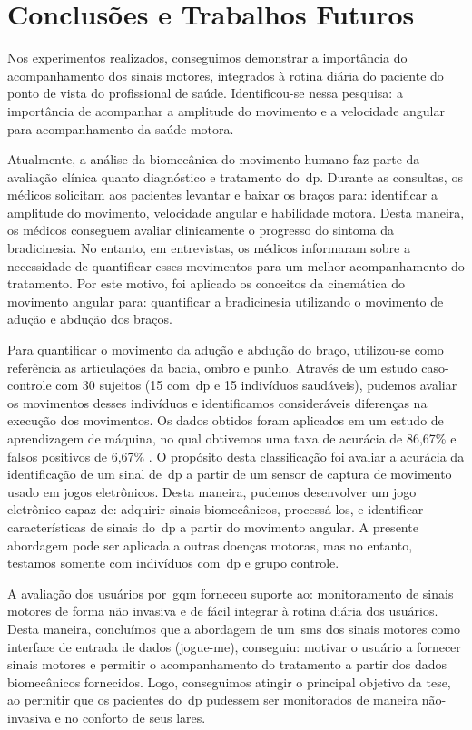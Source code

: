 \chapter{Conclusões e Trabalhos Futuros}\label{chapter:conclusoes_futuros}
Nos experimentos realizados, conseguimos demonstrar a importância do acompanhamento dos sinais motores, integrados à rotina diária do paciente do ponto de vista do profissional de saúde. Identificou-se nessa pesquisa: a importância de acompanhar a amplitude do movimento e a velocidade angular para acompanhamento da saúde motora.


Atualmente, a análise da biomecânica do movimento humano faz parte da avaliação clínica quanto diagnóstico e tratamento do~\ac{dp}. Durante as consultas, os médicos solicitam aos pacientes levantar e baixar os braços para: identificar a amplitude do movimento, velocidade angular e habilidade motora. Desta maneira, os médicos conseguem avaliar clinicamente o progresso do sintoma da bradicinesia. No entanto, em entrevistas, os médicos informaram sobre a necessidade de quantificar esses movimentos para um melhor acompanhamento do tratamento. Por este motivo, foi aplicado os conceitos da cinemática do movimento angular para: quantificar a bradicinesia utilizando o movimento de adução e abdução dos braços.

Para quantificar o movimento da adução e abdução do braço, utilizou-se como referência as articulações da bacia, ombro e punho. Através de um estudo caso-controle com 30 sujeitos (15 com~\ac{dp} e 15 indivíduos saudáveis), pudemos avaliar os movimentos desses indivíduos e identificamos consideráveis diferenças na execução dos movimentos. Os dados obtidos foram aplicados em um estudo de aprendizagem de máquina, no qual obtivemos uma taxa de acurácia de 86,67\% e falsos positivos de 6,67\% . O propósito desta classificação foi avaliar a acurácia da identificação de um sinal de~\ac{dp} a partir de um sensor de captura de movimento usado em jogos eletrônicos. Desta maneira, pudemos desenvolver um jogo eletrônico  capaz de: adquirir sinais biomecânicos, processá-los, e identificar características de sinais do~\ac{dp} a partir do movimento angular. A presente abordagem pode ser aplicada a outras doenças motoras, mas no entanto, testamos somente com indivíduos com~\ac{dp} e grupo controle.

A avaliação dos usuários por~\ac{gqm} forneceu suporte ao: monitoramento de sinais motores de forma não invasiva e de fácil integrar à rotina diária dos usuários. Desta maneira, concluímos que a abordagem de um~\ac{sms} dos sinais motores como interface de entrada de dados (\ac{jogue-me}), conseguiu: motivar o usuário  a fornecer sinais motores e permitir o acompanhamento do tratamento a partir dos dados biomecânicos fornecidos. Logo, conseguimos atingir o principal objetivo da tese, ao permitir que os pacientes do~\ac{dp} pudessem ser monitorados de maneira não-invasiva e no conforto de seus lares.

